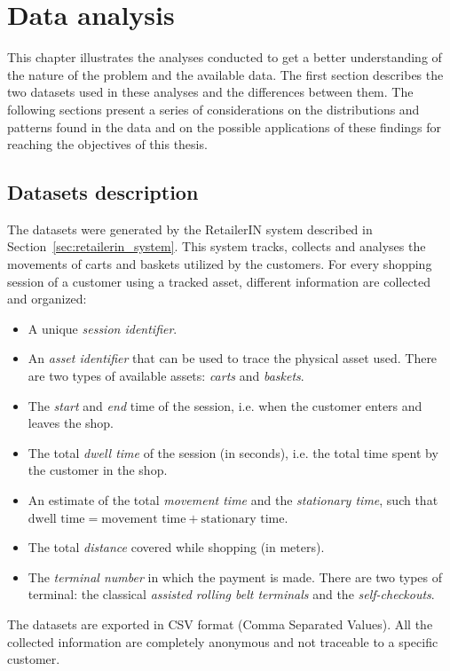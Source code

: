 \chapter{Data analysis}
\label{cha:data_analysis}

This chapter illustrates the analyses conducted to get a better understanding of the nature of the problem and the available data. The first section describes the two datasets used in these analyses and the differences between them. The following sections present a series of considerations on the distributions and patterns found in the data and on the possible applications of these findings for reaching the objectives of this thesis.

\section{Datasets description}
\label{sec:datasets_description}

The datasets were generated by the RetailerIN system described in Section~\ref{sec:retailerin_system}. This system tracks, collects and analyses the movements of carts and baskets utilized by the customers. For every shopping session of a customer using a tracked asset, different information are collected and organized:
\begin{itemize}
  \item A unique \emph{session identifier}.
  \item An \emph{asset identifier} that can be used to trace the physical asset used. There are two types of available assets: \emph{carts} and \emph{baskets}.
  \item The \emph{start} and \emph{end} time of the session, i.e. when the customer enters and leaves the shop.
  \item The total \emph{dwell time} of the session (in seconds), i.e. the total time spent by the customer in the shop.
  \item An estimate of the total \emph{movement time} and the \emph{stationary time}, such that \( \text{dwell time} = \text{movement time} + \text{stationary time} \).
  \item The total \emph{distance} covered while shopping (in meters).
  \item The \emph{terminal number} in which the payment is made. There are two types of terminal: the classical \emph{assisted rolling belt terminals} and the \emph{self-checkouts}.
\end{itemize}
The datasets are exported in CSV format (Comma Separated Values). All the collected information are completely anonymous and not traceable to a specific customer.

